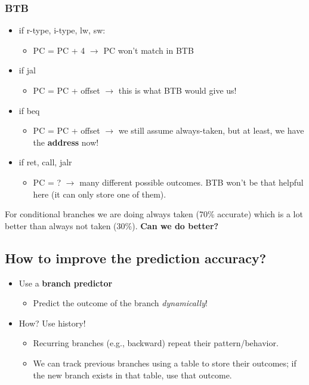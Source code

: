 \documentclass[10pt]{article}
\begin{document}
\subsubsection*{BTB}
\begin{itemize}
    \item if r-type, i-type, lw, sw:
    \begin{itemize}
        \item PC = PC + 4 $\rightarrow$ PC won't match in BTB
    \end{itemize}
    \item if jal
    \begin{itemize}
        \item PC = PC + offset $\rightarrow$ this is what BTB would give us!
    \end{itemize}
    \item if beq
    \begin{itemize}
        \item PC = PC + offset $\rightarrow$ we still assume always-taken, but at least, we have the \textbf{address} now!
    \end{itemize}
    \item if ret, call, jalr
    \begin{itemize}
        \item PC = ? $\rightarrow$ many different possible outcomes.  BTB won't be that helpful here (it can only store one of them).
    \end{itemize}
\end{itemize}
For conditional branches we are doing always taken (70\% accurate) which is a lot better than always not taken (30\%).  \textbf{Can we do better?}

\subsection*{How to improve the prediction accuracy?}
\begin{itemize}
    \item Use a \textbf{branch predictor}
    \begin{itemize}
        \item Predict the outcome of the branch \textit{dynamically}!
    \end{itemize}
    \item How?  Use history!
    \begin{itemize}
        \item Recurring branches (e.g., backward) repeat their pattern/behavior.
        \item We can track previous branches using a table to store their outcomes; if the new branch exists in that table, use that outcome.
    \end{itemize}
\end{itemize}
\end{document}
